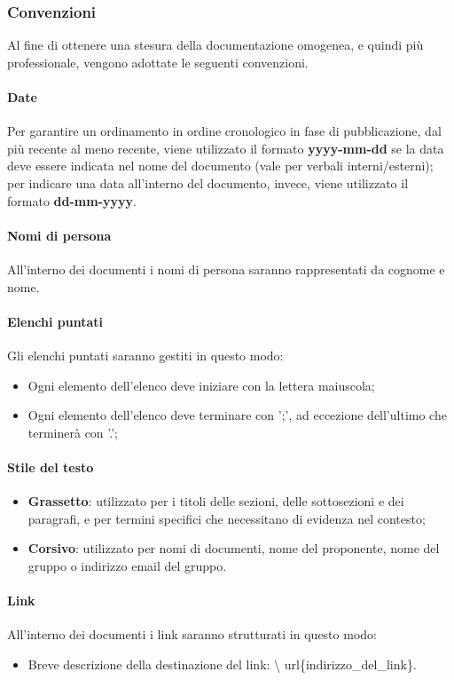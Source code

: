 \subsubsection{Convenzioni}
Al fine di ottenere una stesura della documentazione omogenea, e quindi più
professionale, vengono adottate le seguenti convenzioni.
\paragraph{Date}
Per garantire un ordinamento in ordine cronologico in fase di pubblicazione,
dal più recente al meno recente, viene utilizzato il formato
\textbf{yyyy-mm-dd} se la data deve essere indicata nel nome del documento
(vale per verbali interni/esterni); per indicare una data all'interno del
documento, invece, viene utilizzato il formato \textbf{dd-mm-yyyy}.
\paragraph{Nomi di persona}
All'interno dei documenti i nomi di persona saranno rappresentati da cognome e
nome.
\paragraph{Elenchi puntati}
Gli elenchi puntati saranno gestiti in questo modo:
\begin{itemize}
      \item Ogni elemento dell'elenco deve iniziare con la lettera maiuscola;
      \item Ogni elemento dell'elenco deve terminare con ';', ad eccezione dell'ultimo che
            terminerà con '.';
\end{itemize}
\paragraph{Stile del testo}
\begin{itemize}
      \item \textbf{Grassetto}: utilizzato per i titoli delle sezioni, delle sottosezioni e dei paragrafi,
            e per termini specifici che necessitano di evidenza nel contesto;
      \item \textbf{Corsivo}: utilizzato per nomi di documenti, nome del proponente,
            nome del gruppo o indirizzo email del gruppo.
\end{itemize}
\paragraph{Link}
All'interno dei documenti i link saranno strutturati in questo modo:
\begin{itemize}
      \item Breve descrizione della destinazione del link: \textbackslash
            url\{indirizzo\_del\_link\}.
\end{itemize}
